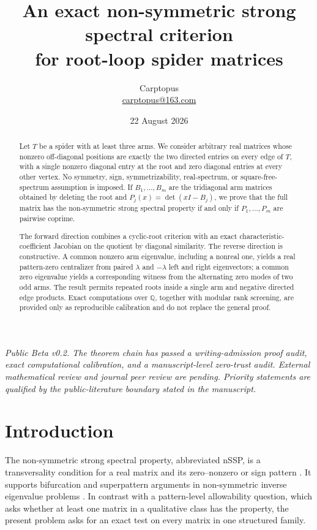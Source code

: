 \documentclass[11pt]{article}
\title{An exact non-symmetric strong spectral criterion\\for root-loop spider matrices}
\author{Carptopus\\\href{mailto:carptopus@163.com}{carptopus@163.com}}
\date{22 August 2026}
\theoremstyle{remark}
\begin{document}
\maketitle

\begin{center}
\small\itshape
Public Beta v0.2. The theorem chain has passed a writing-admission proof audit,
exact computational calibration, and a manuscript-level zero-trust audit.
External mathematical review and journal peer review are pending. Priority statements
are qualified by the public-literature boundary stated in the manuscript.
\end{center}
\vspace{0.8em}

\begin{abstract}

Let $T$ be a spider with at least three arms. We consider arbitrary real matrices whose nonzero off-diagonal positions are exactly the two directed entries on every edge of $T$, with a single nonzero diagonal entry at the root and zero diagonal entries at every other vertex. No symmetry, sign, symmetrizability, real-spectrum, or square-free-spectrum assumption is imposed. If $B_1,\ldots,B_m$ are the tridiagonal arm matrices obtained by deleting the root and $P_j(x)=\det(xI-B_j)$, we prove that the full matrix has the non-symmetric strong spectral property if and only if $P_1,\ldots,P_m$ are pairwise coprime.

The forward direction combines a cyclic-root criterion with an exact characteristic-coefficient Jacobian on the quotient by diagonal similarity. The reverse direction is constructive. A common nonzero arm eigenvalue, including a nonreal one, yields a real pattern-zero centralizer from paired $\lambda$ and $-\lambda$ left and right eigenvectors; a common zero eigenvalue yields a corresponding witness from the alternating zero modes of two odd arms. The result permits repeated roots inside a single arm and negative directed edge products. Exact computations over $\mathbb Q$, together with modular rank screening, are provided only as reproducible calibration and do not replace the general proof.
\end{abstract}

\section{Introduction}

The non-symmetric strong spectral property, abbreviated nSSP, is a transversality condition for a real matrix and its zero--nonzero or sign pattern \cite{ref1,ref3}. It supports bifurcation and superpattern arguments in non-symmetric inverse eigenvalue problems \cite{ref3,ref6}. In contrast with a pattern-level allowability question, which asks whether at least one matrix in a qualitative class has the property, the present problem asks for an exact test on every matrix in one structured family.
\end{document}
